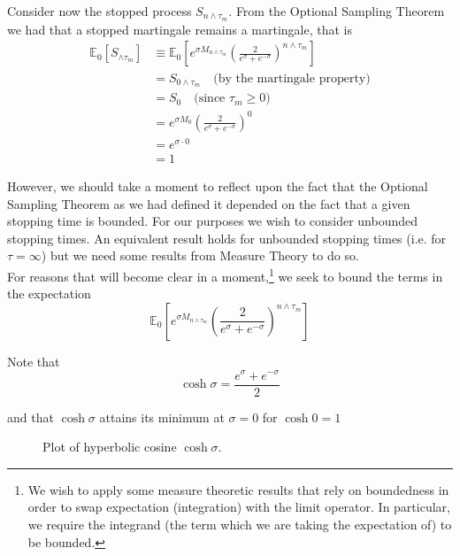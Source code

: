 \documentclass[12pt]{article}
\newlength\tindent
\renewcommand{\indent}{\hspace*{\tindent}}
\newcommand{\E}{\mathbb E}
\begin{document}
\indent Consider now the stopped process $S_{n\land\tau_m}$. From the Optional Sampling Theorem we had that a stopped martingale remains a martingale, that is
\begin{align*}
	\E_0 [S_{\land\tau_m} ] &\equiv \E_0 \left[ e^{\sigma M_{n\land\tau_m}} \left( \frac{2}{e^\sigma + e^{-\sigma}} \right)^{n\land\tau_m} \right] \\
	&= S_{0\land\tau_m} \quad \text{(by the martingale property)} \\
	&= S_0 \quad \text{(since $\tau_m \geq 0$)} \\
	&= e^{\sigma M_0} \left( \frac{2}{e^\sigma + e^{-\sigma}} \right)^0 \\
	&= e^{\sigma\cdot 0} \\
	&= 1 
\end{align*}

\indent However, we should take a moment to reflect upon the fact that the Optional Sampling Theorem as we had defined it depended on the fact that a given stopping time is bounded. For our purposes we wish to consider unbounded stopping times. An equivalent result holds for unbounded stopping times (i.e. for $\tau = \infty$) but we need some results from Measure Theory to do so. \\

\indent For reasons that will become clear in a moment,\footnote{We wish to apply some measure theoretic results that rely on boundedness in order to swap expectation (integration) with the limit operator. In particular, we require the integrand (the term which we are taking the expectation of) to be bounded.} we seek to bound the terms in the expectation 
\begin{equation*}
	\E_0 \left[ e^{\sigma M_{n\land\tau_m}} \left( \frac{2}{e^\sigma + e^{-\sigma}} \right)^{n\land\tau_m} \right]
\end{equation*}

Note that
\begin{equation*}
	\cosh \sigma = \frac{ e^\sigma + e^{-\sigma} }{2}
\end{equation*}

and that $\cosh \sigma$ attains its minimum at $\sigma = 0$ for $\cosh 0 = 1$

\begin{figure}[H]
\centering
{}
\caption{Plot of hyperbolic cosine $\cosh \sigma$.}
\end{figure}
\end{document}
